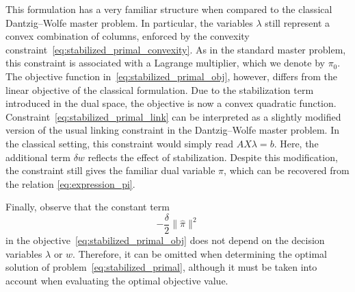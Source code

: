 \documentclass{book}
\theoremstyle{definition}
\numberwithin{algorithm_}{chapter}
\begin{document}
This formulation has a very familiar structure when compared to the classical Dantzig--Wolfe master problem. In particular, the variables $\lambda$ still represent a convex combination of columns, enforced by the convexity constraint~\eqref{eq:stabilized_primal_convexity}. As in the standard master problem, this constraint is associated with a Lagrange multiplier, which we denote by $\pi_0$. The objective function in~\eqref{eq:stabilized_primal_obj}, however, differs from the linear objective of the classical formulation. Due to the stabilization term introduced in the dual space, the objective is now a convex quadratic function. Constraint~\eqref{eq:stabilized_primal_link} can be interpreted as a slightly modified version of the usual linking constraint in the Dantzig--Wolfe master problem. In the classical setting, this constraint would simply read $A X \lambda = b$.
Here, the additional term $\delta w$ reflects the effect of stabilization. Despite this modification, the constraint still gives the familiar dual variable 
$\pi$, which can be recovered from the relation \eqref{eq:expression_pi}. 

\bigskip

Finally, observe that the constant term 
\[
- \frac{\delta}{2} \|\hat{\pi}\|^2
\]
in the objective~\eqref{eq:stabilized_primal_obj} does not depend on the decision variables $\lambda$ or $w$. Therefore, it can be omitted when determining the optimal solution of problem~\eqref{eq:stabilized_primal}, although it must be taken into account when evaluating the optimal objective value.
\end{document}
